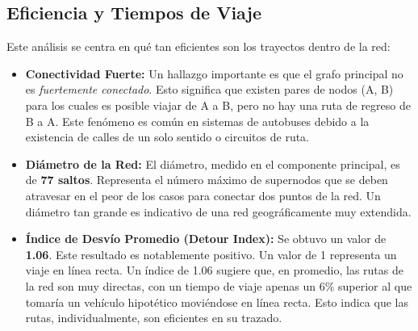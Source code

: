     \subsection{Eficiencia y Tiempos de Viaje}
    Este análisis se centra en qué tan eficientes son los trayectos dentro de la red:
    \begin{itemize}
        \item \textbf{Conectividad Fuerte:} Un hallazgo importante es que el grafo principal no es \textit{fuertemente conectado}. Esto significa que existen pares de nodos (A, B) para los cuales es posible viajar de A a B, pero no hay una ruta de regreso de B a A. Este fenómeno es común en sistemas de autobuses debido a la existencia de calles de un solo sentido o circuitos de ruta.
        \item \textbf{Diámetro de la Red:} El diámetro, medido en el componente principal, es de \textbf{77 saltos}. Representa el número máximo de supernodos que se deben atravesar en el peor de los casos para conectar dos puntos de la red. Un diámetro tan grande es indicativo de una red geográficamente muy extendida.
        \item \textbf{Índice de Desvío Promedio (Detour Index):} Se obtuvo un valor de \textbf{1.06}. Este resultado es notablemente positivo. Un valor de 1 representa un viaje en línea recta. Un índice de 1.06 sugiere que, en promedio, las rutas de la red son muy directas, con un tiempo de viaje apenas un 6\% superior al que tomaría un vehículo hipotético moviéndose en línea recta. Esto indica que las rutas, individualmente, son eficientes en su trazado.
    \end{itemize}

